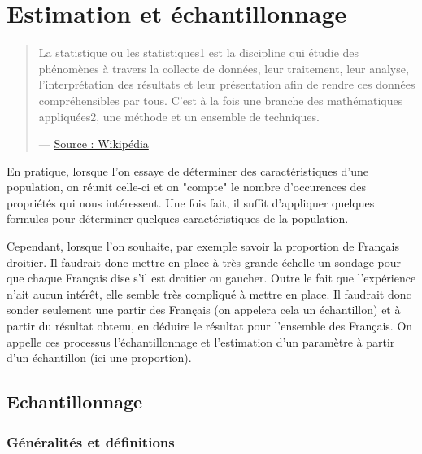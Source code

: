 \chapter{Estimation et échantillonnage}


\begin{quote}
    La statistique ou les statistiques1 est la discipline qui étudie des phénomènes à 
    travers la collecte de données, leur traitement, leur analyse, l'interprétation des 
    résultats et leur présentation afin de rendre ces données compréhensibles par tous. 
    C'est à la fois une branche des mathématiques appliquées2, une méthode et un ensemble de techniques. 

    \hfill --- \href{https://fr.wikipedia.org/wiki/Statistique}{Source : Wikipédia}
\end{quote}

En pratique, lorsque l'on essaye de déterminer des caractéristiques d'une population, 
on réunit celle-ci et on "compte" le nombre d'occurences des propriétés qui nous intéressent. 
Une fois fait, il suffit d'appliquer quelques formules pour déterminer quelques caractéristiques 
de la population. 

Cependant, lorsque l'on souhaite, par exemple savoir la proportion de Français droitier. Il faudrait donc 
mettre en place à très grande échelle un sondage pour que chaque Français dise s'il est droitier ou gaucher. 
Outre le fait que l'expérience n'ait aucun intérêt, elle semble très compliqué à mettre en place. 
Il faudrait donc sonder seulement une partir des Français (on appelera cela un échantillon) et à partir du 
résultat obtenu, en déduire le résultat pour l'ensemble des Français. On appelle ces processus l'échantillonnage 
et l'estimation d'un paramètre à partir d'un échantillon (ici une proportion). 


\section{Echantillonnage}

\subsection{Généralités et définitions}

